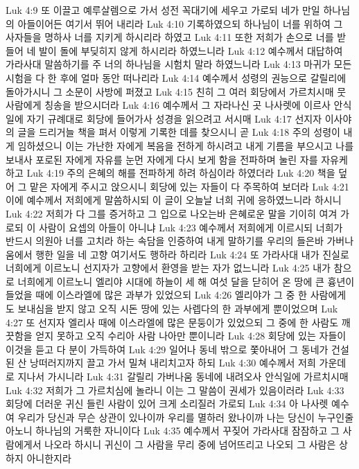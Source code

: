 Luk 4:9  또 이끌고 예루살렘으로 가서 성전 꼭대기에 세우고 가로되 네가 만일 하나님의 아들이어든 여기서 뛰어 내리라
Luk 4:10  기록하였으되 하나님이 너를 위하여 그 사자들을 명하사 너를 지키게 하시리라 하였고
Luk 4:11  또한 저희가 손으로 너를 받들어 네 발이 돌에 부딪히지 않게 하시리라 하였느니라
Luk 4:12  예수께서 대답하여 가라사대 말씀하기를 주 너의 하나님을 시험치 말라 하였느니라
Luk 4:13  마귀가 모든 시험을 다 한 후에 얼마 동안 떠나리라
Luk 4:14  예수께서 성령의 권능으로 갈릴리에 돌아가시니 그 소문이 사방에 퍼졌고
Luk 4:15  친히 그 여러 회당에서 가르치시매 뭇사람에게 칭송을 받으시더라
Luk 4:16  예수께서 그 자라나신 곳 나사렛에 이르사 안식일에 자기 규례대로 회당에 들어가사 성경을 읽으려고 서시매
Luk 4:17  선지자 이사야의 글을 드리거늘 책을 펴서 이렇게 기록한 데를 찾으시니 곧
Luk 4:18  주의 성령이 내게 임하셨으니 이는 가난한 자에게 복음을 전하게 하시려고 내게 기름을 부으시고 나를 보내사 포로된 자에게 자유를 눈먼 자에게 다시 보게 함을 전파하며 눌린 자를 자유케 하고
Luk 4:19  주의 은혜의 해를 전파하게 하려 하심이라 하였더라
Luk 4:20  책을 덮어 그 맡은 자에게 주시고 앉으시니 회당에 있는 자들이 다 주목하여 보더라
Luk 4:21  이에 예수께서 저희에게 말씀하시되 이 글이 오늘날 너희 귀에 응하였느니라 하시니
Luk 4:22  저희가 다 그를 증거하고 그 입으로 나오는바 은혜로운 말을 기이히 여겨 가로되 이 사람이 요셉의 아들이 아니냐
Luk 4:23  예수께서 저희에게 이르시되 너희가 반드시 의원아 너를 고치라 하는 속담을 인증하여 내게 말하기를 우리의 들은바 가버나움에서 행한 일을 네 고향 여기서도 행하라 하리라
Luk 4:24  또 가라사대 내가 진실로 너희에게 이르노니 선지자가 고향에서 환영을 받는 자가 없느니라
Luk 4:25  내가 참으로 너희에게 이르노니 엘리야 시대에 하늘이 세 해 여섯 달을 닫히어 온 땅에 큰 흉년이 들었을 때에 이스라엘에 많은 과부가 있었으되
Luk 4:26  엘리야가 그 중 한 사람에게도 보내심을 받지 않고 오직 시돈 땅에 있는 사렙다의 한 과부에게 뿐이었으며
Luk 4:27  또 선지자 엘리사 때에 이스라엘에 많은 문둥이가 있었으되 그 중에 한 사람도 깨끗함을 얻지 못하고 오직 수리아 사람 나아만 뿐이니라
Luk 4:28  회당에 있는 자들이 이것을 듣고 다 분이 가득하여
Luk 4:29  일어나 동네 밖으로 쫓아내어 그 동네가 건설된 산 낭떠러지까지 끌고 가서 밀쳐 내리치고자 하되
Luk 4:30  예수께서 저희 가운데로 지나서 가시니라
Luk 4:31  갈릴리 가버나움 동네에 내려오사 안식일에 가르치시매
Luk 4:32  저희가 그 가르치심에 놀라니 이는 그 말씀이 권세가 있음이러라
Luk 4:33  회당에 더러운 귀신 들린 사람이 있어 크게 소리질러 가로되
Luk 4:34  아 나사렛 예수여 우리가 당신과 무슨 상관이 있나이까 우리를 멸하러 왔나이까 나는 당신이 누구인줄 아노니 하나님의 거룩한 자니이다
Luk 4:35  예수께서 꾸짖어 가라사대 잠잠하고 그 사람에게서 나오라 하시니 귀신이 그 사람을 무리 중에 넘어뜨리고 나오되 그 사람은 상하지 아니한지라
